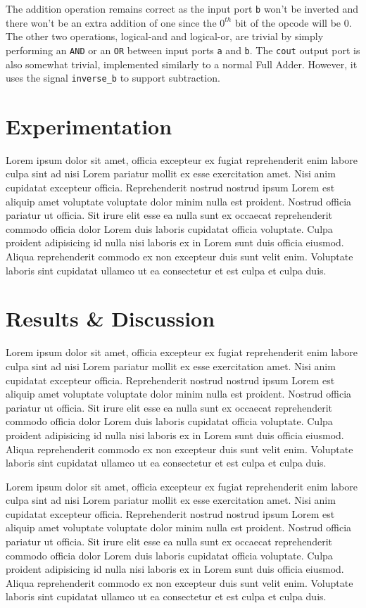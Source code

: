 \documentclass[11pt]{report}
\begin{document}
The addition operation remains correct as the input port \verb|b| won't be inverted and there
won't be an extra addition of one since the $0^{th}$ bit of the opcode will be $0$. The other two
operations, logical-and and logical-or, are trivial by simply performing an \verb|AND| or an
\verb|OR| between input ports \verb|a| and \verb|b|. The \verb|cout| output port is also somewhat
trivial, implemented similarly to a normal Full Adder. However, it uses the signal \verb|inverse_b|
to support subtraction.


\section*{Experimentation}
Lorem ipsum dolor sit amet, officia excepteur ex fugiat reprehenderit enim labore culpa sint ad nisi
Lorem pariatur mollit ex esse exercitation amet. Nisi anim cupidatat excepteur officia.
Reprehenderit nostrud nostrud ipsum Lorem est aliquip amet voluptate voluptate dolor minim nulla est
proident. Nostrud officia pariatur ut officia. Sit irure elit esse ea nulla sunt ex occaecat
reprehenderit commodo officia dolor Lorem duis laboris cupidatat officia voluptate. Culpa proident
adipisicing id nulla nisi laboris ex in Lorem sunt duis officia eiusmod. Aliqua reprehenderit
commodo ex non excepteur duis sunt velit enim. Voluptate laboris sint cupidatat ullamco ut ea
consectetur et est culpa et culpa duis.

\newpage

\section*{Results \& Discussion}
Lorem ipsum dolor sit amet, officia excepteur ex fugiat reprehenderit enim labore culpa sint ad nisi
Lorem pariatur mollit ex esse exercitation amet. Nisi anim cupidatat excepteur officia.
Reprehenderit nostrud nostrud ipsum Lorem est aliquip amet voluptate voluptate dolor minim nulla est
proident. Nostrud officia pariatur ut officia. Sit irure elit esse ea nulla sunt ex occaecat
reprehenderit commodo officia dolor Lorem duis laboris cupidatat officia voluptate. Culpa proident
adipisicing id nulla nisi laboris ex in Lorem sunt duis officia eiusmod. Aliqua reprehenderit
commodo ex non excepteur duis sunt velit enim. Voluptate laboris sint cupidatat ullamco ut ea
consectetur et est culpa et culpa duis.

Lorem ipsum dolor sit amet, officia excepteur ex fugiat reprehenderit enim labore culpa sint ad nisi
Lorem pariatur mollit ex esse exercitation amet. Nisi anim cupidatat excepteur officia.
Reprehenderit nostrud nostrud ipsum Lorem est aliquip amet voluptate voluptate dolor minim nulla est
proident. Nostrud officia pariatur ut officia. Sit irure elit esse ea nulla sunt ex occaecat
reprehenderit commodo officia dolor Lorem duis laboris cupidatat officia voluptate. Culpa proident
adipisicing id nulla nisi laboris ex in Lorem sunt duis officia eiusmod. Aliqua reprehenderit
commodo ex non excepteur duis sunt velit enim. Voluptate laboris sint cupidatat ullamco ut ea
consectetur et est culpa et culpa duis.
\end{document}
